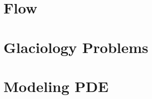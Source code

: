 \documentclass[a4paper,english]{report}    %
\begin{document}
\graphicspath{{./}{WaveguideGUI/}}


\part{Flow}

\graphicspath{{./}{FlowStepGUI/}}


\graphicspath{{./}{FlowStepKe/}}


\graphicspath{{./}{VonKarmanGUI/}}


\graphicspath{{./}{CurvedPipeGUI/}}


\graphicspath{{./}{FsiObstacleGUI/}}


\graphicspath{{./}{RayleighBenardGUI/}}


\part{Glaciology Problems}

\graphicspath{{./}{ToyGlacierTemperature/}}



\part{Modeling PDE}

\graphicspath{{./}{ModelPDE3D/}}



 





{} %

\printindex

\end{document}
